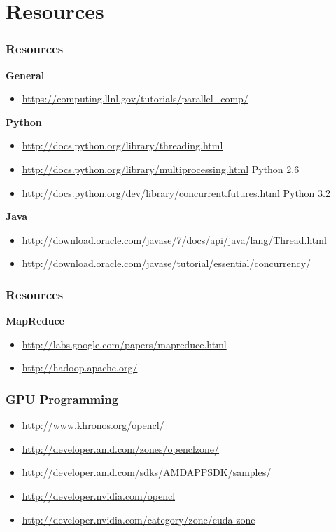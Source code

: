 \documentclass[t]{beamer}
\begin{document}
\section{Resources}
\begin{frame}
\frametitle{Resources}
\textbf{General}
\begin{itemize}
  \item \url{https://computing.llnl.gov/tutorials/parallel_comp/}
\end{itemize}

\textbf{Python}
\begin{itemize}
  \item \url{http://docs.python.org/library/threading.html}
  \item \url{http://docs.python.org/library/multiprocessing.html} \tiny{Python 2.6}
  \item \url{http://docs.python.org/dev/library/concurrent.futures.html} \tiny{Python 3.2}
\end{itemize}

\textbf{Java}
\begin{itemize}
  \item \url{http://download.oracle.com/javase/7/docs/api/java/lang/Thread.html}
  \item \url{http://download.oracle.com/javase/tutorial/essential/concurrency/}
\end{itemize}
\end{frame}
\begin{frame}
\frametitle{Resources}
\textbf{MapReduce}
\begin{itemize}
  \item \url{http://labs.google.com/papers/mapreduce.html}
  \item \url{http://hadoop.apache.org/}
\end{itemize}
\end{frame}

\begin{frame}
\frametitle{GPU Programming}
\begin{itemize}
  \item \url{http://www.khronos.org/opencl/}
  \item \url{http://developer.amd.com/zones/openclzone/}
  \item \url{http://developer.amd.com/sdks/AMDAPPSDK/samples/}
  \item \url{http://developer.nvidia.com/opencl}
  \item \url{http://developer.nvidia.com/category/zone/cuda-zone}
\end{itemize}
\end{frame}

\frame{\tableofcontents}

\frame{\titlepage}
\end{document}
